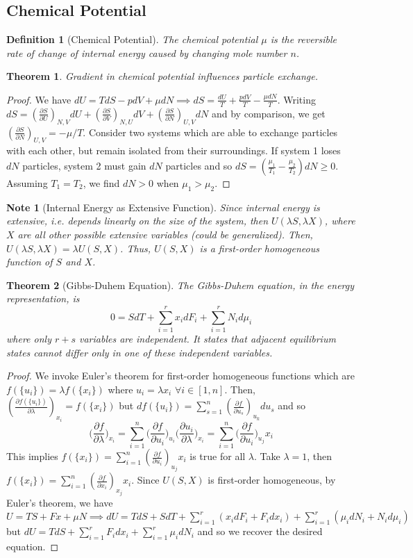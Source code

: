 \documentclass[a4paper]{article}
\newtheorem{Note}{Note}[section]
\theoremstyle{new}
\newtheorem{defi}{Definition}[section]
\newtheorem{thm}{Theorem}[section]
\begin{document}
\subsection{Chemical Potential}
\begin{defi}[Chemical Potential]
The chemical potential $\mu$ is the reversible rate of change of internal energy caused by changing mole number $n$.
\end{defi}
\begin{thm}
Gradient in chemical potential influences particle exchange.
\end{thm}
\begin{proof}
We have $dU=TdS-pdV+\mu dN\implies dS=\frac{dU}{T}+\frac{pdV}{T}-\frac{\mu dN}{T}$. Writing $dS=(\frac{\partial S}{\partial U})_{N,V}dU+(\frac{\partial S}{\partial V})_{N,U}dV+(\frac{\partial S}{\partial N})_{U,V}dN$ and by comparison, we get $(\frac{\partial S}{\partial N})_{U,V}=-\mu/T$. Consider two systems which are able to exchange particles with each other, but remain isolated from their surroundings. If system 1 loses $dN$ particles, system 2 must gain $dN$ particles and so $dS=(\frac{\mu_1}{T_1}-\frac{\mu_2}{T_2})dN\geq0$. Assuming $T_1=T_2$, we find $dN>0$ when $\mu_1>\mu_2$.
\end{proof}
\begin{Note}[Internal Energy as Extensive Function]
Since internal energy is extensive, i.e. depends linearly on the size of the system, then $U(\lambda S, \lambda X)$, where $X$ are all other possible extensive variables (could be generalized). Then, $U(\lambda S,\lambda X)=\lambda U(S,X)$. Thus, $U(S,X)$ is a first-order homogeneous function of $S$ and $X$.
\end{Note}
\begin{thm}[Gibbs-Duhem Equation]
The Gibbs-Duhem equation, in the energy representation, is
$$0=SdT+\sum_{i=1}^rx_idF_i+\sum_{i=1}^rN_id\mu_i$$
where only $r+s$ variables are independent. It states that adjacent equilibrium states cannot differ only in one of these independent variables.
\end{thm}
\begin{proof}
We invoke Euler's theorem for first-order homogeneous functions which are $f(\{u_i\})=\lambda f(\{x_i\})$ where $u_i=\lambda x_i$ $\forall i\in[1,n]$. Then, $(\frac{\partial f(\{u_i\})}{\partial \lambda})_{x_i}=f(\{x_i\})$ but $df(\{u_i\})=\sum_{s=1}^n(\frac{\partial f}{\partial u_s})_{u_k}du_s$ and so
$$\bigg(\frac{\partial f}{\partial\lambda}\bigg)_{x_i}=\sum_{i=1}^n\bigg(\frac{\partial f}{\partial u_i}\bigg)_{u_i}\bigg(\frac{\partial u_i}{\partial\lambda}\bigg)_{x_i}=\sum_{i=1}^n\bigg(\frac{\partial f}{\partial u_i}\bigg)_{u_j}x_i$$
This implies $f(\{x_i\})=\sum_{i=1}^n(\frac{\partial f}{\partial u_i})_{u_j}x_i$ is true for all $\lambda$. Take $\lambda=1$, then $f(\{x_i\})=\sum_{i=1}^n(\frac{\partial f}{\partial x_i})_{x_j}x_i$. Since $U(S,X)$ is first-order homogeneous, by Euler's theorem, we have $U=TS+Fx+\mu N\implies dU=TdS+SdT+\sum_{i=1}^r(x_idF_i+F_idx_i)+\sum_{i=1}^r(\mu_idN_i+N_id\mu_i)$ but $dU=TdS+\sum_{i=1}^rF_idx_i+\sum_{i=1}^r\mu_idN_i$ and so we recover the desired equation.
\end{proof}
\end{document}
